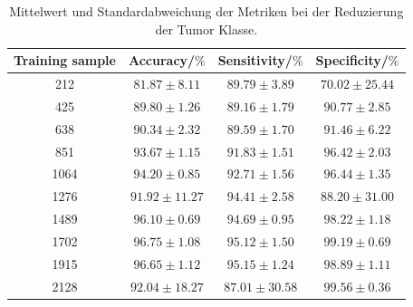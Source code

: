 \begin{table}[H]
    \centering
     {\small
        \begin{tabular}{cccc}
            \toprule
            Training sample & Accuracy/$\%$ & Sensitivity/$\%$ & Specificity/$\%$\\
            \midrule
            212  & $81.87 \pm 8.11$ & $89.79 \pm 3.89$ & $ 70.02 \pm 25.44$\\
            425  & $89.80 \pm 1.26$ & $89.16 \pm 1.79$ & $ 90.77 \pm 2.85$\\
            638  & $90.34 \pm 2.32$ & $89.59 \pm 1.70$ & $ 91.46 \pm 6.22$\\
            851  & $93.67 \pm 1.15$ & $91.83 \pm 1.51$ & $ 96.42 \pm 2.03$\\
            1064 & $94.20 \pm 0.85$ & $92.71 \pm 1.56$ & $ 96.44 \pm 1.35$\\
            1276 & $91.92 \pm 11.27$& $94.41 \pm 2.58$ & $ 88.20 \pm 31.00$\\
            1489 & $96.10 \pm 0.69$ & $94.69 \pm 0.95$ & $ 98.22 \pm 1.18$\\
            1702 & $96.75 \pm 1.08$ & $95.12 \pm 1.50$ & $ 99.19 \pm 0.69$\\
            1915 & $96.65 \pm 1.12$ & $95.15 \pm 1.24$ & $ 98.89 \pm 1.11$\\
            2128 & $92.04 \pm 18.27$& $87.01 \pm 30.58$ &$ 99.56 \pm 0.36$\\
            \bottomrule
        \end{tabular}}
  \caption{Mittelwert und Standardabweichung der Metriken bei der Reduzierung der Tumor Klasse.}
  \label{tab:red_tu}
\end{table}

